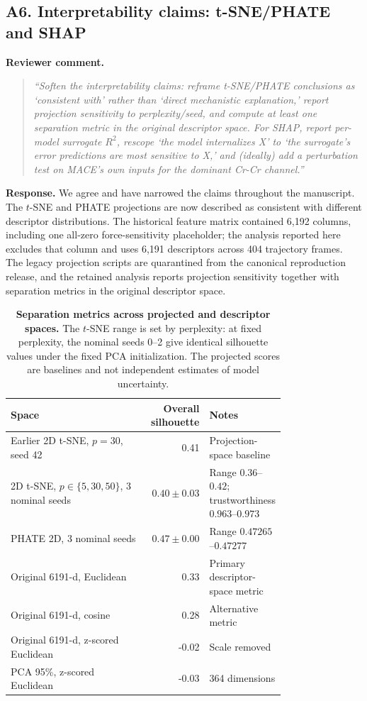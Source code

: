 \documentclass[11pt,a4paper]{article}
\begin{document}
\subsection*{A6. Interpretability claims: t-SNE/PHATE and SHAP}

\noindent\textbf{Reviewer comment.}
\begin{quote}
\itshape
``Soften the interpretability claims: reframe t-SNE/PHATE conclusions as `consistent with' rather than `direct mechanistic explanation,' report projection sensitivity to perplexity/seed, and compute at least one separation metric in the original descriptor space. For SHAP, report per-model surrogate $R^2$, rescope `the model internalizes X' to `the surrogate's error predictions are most sensitive to X,' and (ideally) add a perturbation test on MACE's own inputs for the dominant Cr-Cr channel.''
\end{quote}

\noindent\textbf{Response.}
We agree and have narrowed the claims throughout the manuscript. The $t$-SNE and PHATE projections are now described as consistent with different descriptor distributions. The historical feature matrix contained 6,192 columns, including one all-zero force-sensitivity placeholder; the analysis reported here excludes that column and uses 6,191 descriptors across 404 trajectory frames. The legacy projection scripts are quarantined from the canonical reproduction release, and the retained analysis reports projection sensitivity together with separation metrics in the original descriptor space.

\begin{table}[h]
\centering
\scriptsize
\setlength{\tabcolsep}{2pt}
\caption{\textbf{Separation metrics across projected and descriptor spaces.} The $t$-SNE range is set by perplexity: at fixed perplexity, the nominal seeds 0--2 give identical silhouette values under the fixed PCA initialization. The projected scores are baselines and not independent estimates of model uncertainty.}
\begin{tabular}{p{0.50\linewidth}rp{0.27\linewidth}}
\toprule
Space & Overall silhouette & Notes \\
\midrule
Earlier 2D t-SNE, $p=30$, seed 42 & 0.41 & Projection-space baseline \\
2D t-SNE, $p \in \{5,30,50\}$, 3 nominal seeds & $0.40 \pm 0.03$ & Range $0.36$--$0.42$; trustworthiness $0.963$--$0.973$ \\
PHATE 2D, 3 nominal seeds & $0.47 \pm 0.00$ & Range $0.47265$--$0.47277$ \\
Original 6191-d, Euclidean & 0.33 & Primary descriptor-space metric \\
Original 6191-d, cosine & 0.28 & Alternative metric \\
Original 6191-d, z-scored Euclidean & -0.02 & Scale removed \\
PCA 95\%, z-scored Euclidean & -0.03 & 364 dimensions \\
\bottomrule
\end{tabular}
\end{table}
\end{document}
